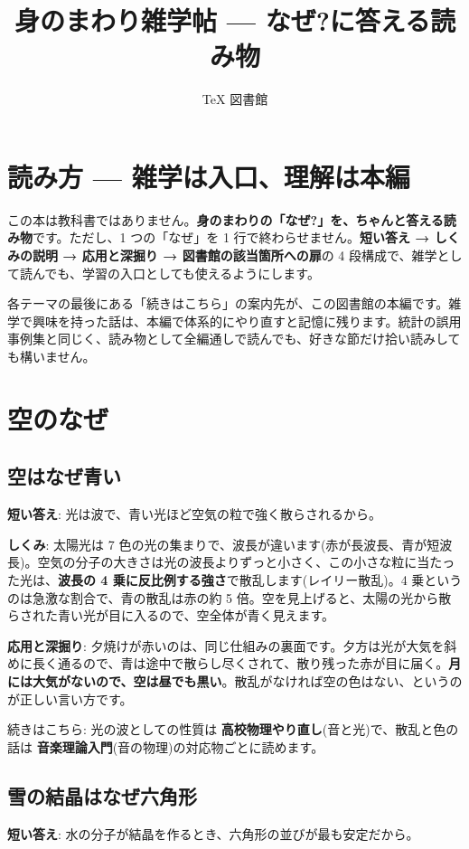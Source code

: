 \documentclass{article}
\title{身のまわり雑学帖 — なぜ?に答える読み物}
\author{TeX 図書館}
\begin{document}
\section{読み方 — 雑学は入口、理解は本編}

この本は教科書ではありません。\textbf{身のまわりの「なぜ?」を、ちゃんと答える読み物}です。ただし、1 つの「なぜ」を 1 行で終わらせません。\textbf{短い答え → しくみの説明 → 応用と深掘り → 図書館の該当箇所への扉}の 4 段構成で、雑学として読んでも、学習の入口としても使えるようにします。

各テーマの最後にある「続きはこちら」の案内先が、この図書館の本編です。雑学で興味を持った話は、本編で体系的にやり直すと記憶に残ります。統計の誤用事例集と同じく、読み物として全編通しで読んでも、好きな節だけ拾い読みしても構いません。

\section{空のなぜ}

\subsection{空はなぜ青い}

\textbf{短い答え}: 光は波で、青い光ほど空気の粒で強く散らされるから。

\textbf{しくみ}: 太陽光は 7 色の光の集まりで、波長が違います(赤が長波長、青が短波長)。空気の分子の大きさは光の波長よりずっと小さく、この小さな粒に当たった光は、\textbf{波長の 4 乗に反比例する強さ}で散乱します(レイリー散乱)。4 乗というのは急激な割合で、青の散乱は赤の約 5 倍。空を見上げると、太陽の光から散らされた青い光が目に入るので、空全体が青く見えます。

\textbf{応用と深掘り}: 夕焼けが赤いのは、同じ仕組みの裏面です。夕方は光が大気を斜めに長く通るので、青は途中で散らし尽くされて、散り残った赤が目に届く。\textbf{月には大気がないので、空は昼でも黒い}。散乱がなければ空の色はない、というのが正しい言い方です。

続きはこちら: 光の波としての性質は \textbf{高校物理やり直し}(音と光)で、散乱と色の話は \textbf{音楽理論入門}(音の物理)の対応物ごとに読めます。

\subsection{雪の結晶はなぜ六角形}

\textbf{短い答え}: 水の分子が結晶を作るとき、六角形の並びが最も安定だから。
\end{document}
